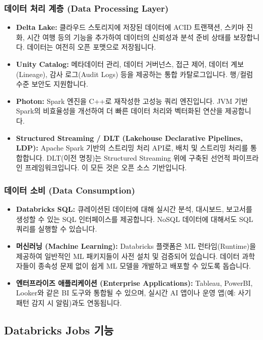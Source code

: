 \documentclass[11pt,a4paper]{article}
\begin{document}
\subsubsection{데이터 처리 계층 (Data Processing Layer)}
\begin{itemize}
    \item \textbf{Delta Lake:} 클라우드 스토리지에 저장된 데이터에 ACID 트랜잭션, 스키마 진화, 시간 여행 등의 기능을 추가하여 데이터의 신뢰성과 분석 준비 상태를 보장합니다. 데이터는 여전히 오픈 포맷으로 저장됩니다.
    \item \textbf{Unity Catalog:} 메타데이터 관리, 데이터 거버넌스, 접근 제어, 데이터 계보(Lineage), 감사 로그(Audit Logs) 등을 제공하는 통합 카탈로그입니다. 행/컬럼 수준 보안도 지원합니다.
    \item \textbf{Photon:} Spark 엔진을 C++로 재작성한 고성능 쿼리 엔진입니다. JVM 기반 Spark의 비효율성을 개선하여 더 빠른 데이터 처리와 벡터화된 연산을 제공합니다.
    \item \textbf{Structured Streaming / DLT (Lakehouse Declarative Pipelines, LDP):} Apache Spark 기반의 스트리밍 처리 API로, 배치 및 스트리밍 처리를 통합합니다. DLT(이전 명칭)는 Structured Streaming 위에 구축된 선언적 파이프라인 프레임워크입니다. 이 모든 것은 오픈 소스 기반입니다.
\end{itemize}

\subsubsection{데이터 소비 (Data Consumption)}
\begin{itemize}
    \item \textbf{Databricks SQL:} 큐레이션된 데이터에 대해 실시간 분석, 대시보드, 보고서를 생성할 수 있는 SQL 인터페이스를 제공합니다. NoSQL 데이터에 대해서도 SQL 쿼리를 실행할 수 있습니다.
    \item \textbf{머신러닝 (Machine Learning):} Databricks 플랫폼은 ML 런타임(Runtime)을 제공하여 일반적인 ML 패키지들이 사전 설치 및 검증되어 있습니다. 데이터 과학자들이 종속성 문제 없이 쉽게 ML 모델을 개발하고 배포할 수 있도록 돕습니다.
    \item \textbf{엔터프라이즈 애플리케이션 (Enterprise Applications):} Tableau, PowerBI, Looker와 같은 BI 도구와 통합될 수 있으며, 실시간 AI 앱이나 운영 앱(예: 사기 패턴 감지 시 알림)과도 연동됩니다.
\end{itemize}

\subsection{Databricks Jobs 기능}
\end{document}
